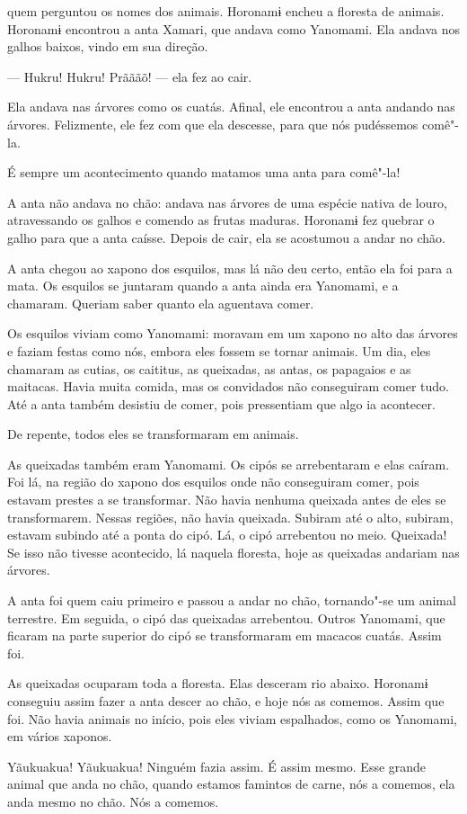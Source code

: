  

 

 quem perguntou os nomes dos animais. Horonamɨ encheu a
floresta de animais. 
Horonamɨ encontrou a anta Xamari, que andava como Yanomami. Ela andava
nos galhos baixos, vindo em sua direção. 

--- Hukru! Hukru! Prãããõ! --- ela fez ao cair. 

Ela andava nas árvores como os cuatás. Afinal, ele encontrou a anta
andando nas árvores. Felizmente, ele fez com que ela descesse, para que
nós pudéssemos comê"-la. 

É sempre um acontecimento quando matamos uma anta para comê"-la! 

A anta não andava no chão: andava nas árvores de uma espécie nativa de
louro, atravessando os galhos e comendo as frutas maduras. Horonamɨ fez
quebrar o galho para que a anta caísse. Depois de cair, ela se acostumou
a andar no chão. 

A anta chegou ao xapono dos esquilos, mas lá não deu certo, então ela
foi para a mata. Os esquilos se juntaram quando a anta ainda era Yanomami,
e a chamaram. Queriam saber quanto ela aguentava comer.

Os esquilos viviam como Yanomami: moravam em um xapono no alto das
árvores e faziam festas como nós, embora eles fossem se tornar animais.
Um dia, eles chamaram as cutias, os caititus, as queixadas, as antas, os
papagaios e as maitacas. Havia muita comida, mas os convidados não
conseguiram comer tudo. Até a anta também desistiu de comer, pois
pressentiam que algo ia acontecer. 

De repente, todos eles se transformaram em animais. 

As queixadas também eram Yanomami. Os cipós se
arrebentaram e elas caíram. Foi lá, na região do xapono dos esquilos
onde não conseguiram comer, pois estavam prestes a se transformar. Não
havia nenhuma queixada antes de eles se transformarem. Nessas regiões,
não havia queixada. Subiram até o alto, subiram, estavam subindo até a
ponta do cipó. Lá, o cipó arrebentou no meio. Queixada! Se isso não
tivesse acontecido, lá naquela floresta, hoje as queixadas andariam nas
árvores. 

A anta foi quem caiu primeiro e passou a andar no chão, tornando"-se um
animal terrestre. Em seguida, o cipó das queixadas arrebentou. Outros
Yanomami, que ficaram na parte superior do cipó se transformaram em
macacos cuatás. Assim foi. 

As queixadas ocuparam toda a floresta. Elas desceram rio abaixo.
Horonamɨ conseguiu assim fazer a anta descer ao chão, e hoje nós as
comemos. Assim que foi. Não havia animais no início, pois eles viviam
espalhados, como os Yanomami, em vários xaponos. 

Yãukuakua! Yãukuakua! Ninguém fazia assim. É assim mesmo. Esse
grande animal que anda no chão, quando estamos famintos de carne, nós a
comemos, ela anda mesmo no chão. Nós a comemos. 

 
